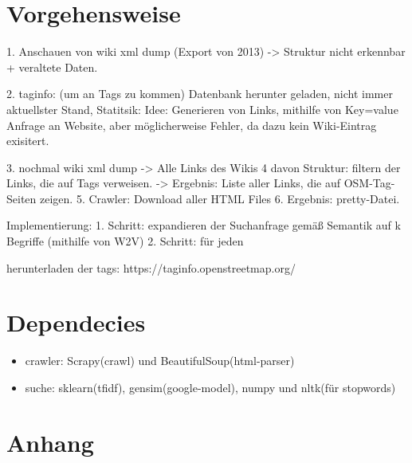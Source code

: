 \documentclass[12pt,pdftex,a4paper]{article}
\begin{document}
\pagebreak
\section{Vorgehensweise}

1. Anschauen von wiki xml dump (Export von 2013) 
-> Struktur nicht erkennbar + veraltete Daten.

2. taginfo: (um an Tags zu kommen) Datenbank herunter geladen, nicht immer aktuellster Stand, Statitsik: Idee: Generieren von Links, mithilfe von Key=value Anfrage an Website, aber möglicherweise Fehler, da dazu kein Wiki-Eintrag exisitert.

3. nochmal wiki xml dump -> Alle Links des Wikis
4  davon Struktur: filtern der Links, die auf Tags verweisen.
-> Ergebnis: Liste aller Links, die auf OSM-Tag-Seiten zeigen.
5. Crawler: Download aller HTML Files
6. Ergebnis: pretty-Datei.

Implementierung:
1. Schritt: expandieren der Suchanfrage gemäß Semantik auf k Begriffe (mithilfe von W2V) 
2. Schritt: für jeden 


herunterladen der tags: https://taginfo.openstreetmap.org/


\section{Dependecies}
\begin{itemize}
	\item crawler: Scrapy(crawl) und BeautifulSoup(html-parser)
	\item suche: sklearn(tfidf), gensim(google-model), numpy und nltk(für stopwords)
\end{itemize}

\pagebreak
\section{Anhang}




\end{document}
